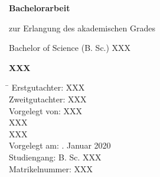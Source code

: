 \begin{center}


\vfill

\Large{\textbf{Bachelorarbeit}}

\vspace{2mm}

\normalsize{zur Erlangung des akademischen Grades}

\normalsize{Bachelor of Science (B. Sc.) XXX}

\vspace{1cm}

\Large{\textbf{XXX}}

\vfill

\parbox{1cm}
{
\begin{normalsize}
\begin{tabbing}
\hspace{5cm} \= \kill
Erstgutachter: \> XXX \\
Zweitgutachter: \> XXX \\[3mm]
Vorgelegt von: \> XXX \\
\> XXX \\
\> XXX \\[3mm]
Vorgelegt am: . Januar 2020 \\
Studiengang: \> B. Sc. XXX \\
Matrikelnummer: \> XXX
\end{tabbing}
\end{normalsize}
}

\end{center}
